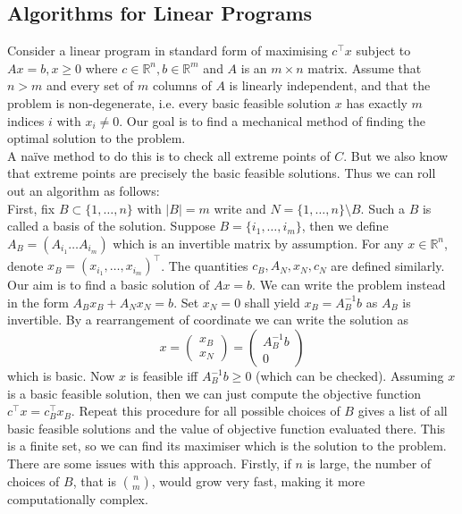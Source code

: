 \subsection{Algorithms for Linear Programs}
Consider a linear program in standard form of maximising $c^\top x$ subject to $Ax=b,x\ge 0$ where $c\in\mathbb R^n,b\in\mathbb R^m$ and $A$ is an $m\times n$ matrix.
Assume that $n>m$ and every set of $m$ columns of $A$ is linearly independent, and that the problem is non-degenerate, i.e. every basic feasible solution $x$ has exactly $m$ indices $i$ with $x_i\neq 0$.
Our goal is to find a mechanical method of finding the optimal solution to the problem.\\
A na\"ive method to do this is to check all extreme points of $C$.
But we also know that extreme points are precisely the basic feasible solutions.
Thus we can roll out an algorithm as follows:\\
First, fix $B\subset\{1,\ldots,n\}$ with $|B|=m$ write and $N=\{1,\ldots,n\}\setminus B$.
Such a $B$ is called a basis of the solution.
Suppose $B=\{i_1,\ldots,i_m\}$, then we define $A_B=(A_{i_1}\ldots A_{i_m})$ which is an invertible matrix by assumption.
For any $x\in\mathbb R^n$, denote $x_B=(x_{i_1},\ldots,x_{i_m})^\top$.
The quantities $c_B,A_N,x_N,c_N$ are defined similarly.\\
Our aim is to find a basic solution of $Ax=b$.
We can write the problem instead in the form $A_Bx_B+A_Nx_N=b$.
Set $x_N=0$ shall yield $x_B=A_B^{-1}b$ as $A_B$ is invertible.
By a rearrangement of coordinate we can write the solution as
$$x=\begin{pmatrix}
    x_B\\
    x_N
\end{pmatrix}=\begin{pmatrix}
    A_B^{-1}b\\
    0
\end{pmatrix}$$
which is basic.
Now $x$ is feasible iff $A_B^{-1}b\ge0$ (which can be checked).
Assuming $x$ is a basic feasible solution, then we can just compute the objective function $c^\top x=c_B^\top x_B$.
Repeat this procedure for all possible choices of $B$ gives a list of all basic feasible solutions and the value of objective function evaluated there.
This is a finite set, so we can find its maximiser which is the solution to the problem.\\
There are some issues with this approach.
Firstly, if $n$ is large, the number of choices of $B$, that is $\binom{n}{m}$, would grow very fast, making it more computationally complex.

